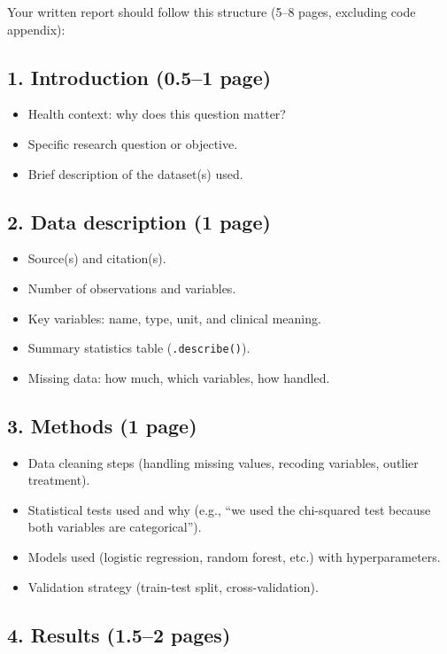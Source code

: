 Your written report should follow this structure (5--8 pages, excluding code appendix):

\subsection{1. Introduction (0.5--1 page)}

\begin{itemize}
  \item Health context: why does this question matter?
  \item Specific research question or objective.
  \item Brief description of the dataset(s) used.
\end{itemize}

\subsection{2. Data description (1 page)}

\begin{itemize}
  \item Source(s) and citation(s).
  \item Number of observations and variables.
  \item Key variables: name, type, unit, and clinical meaning.
  \item Summary statistics table (\texttt{.describe()}).
  \item Missing data: how much, which variables, how handled.
\end{itemize}

\subsection{3. Methods (1 page)}

\begin{itemize}
  \item Data cleaning steps (handling missing values, recoding variables, outlier treatment).
  \item Statistical tests used and why (e.g., ``we used the chi-squared test because both variables are categorical'').
  \item Models used (logistic regression, random forest, etc.) with hyperparameters.
  \item Validation strategy (train-test split, cross-validation).
\end{itemize}

\subsection{4. Results (1.5--2 pages)}

